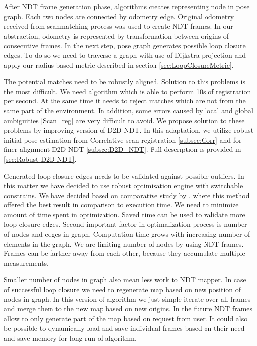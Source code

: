After \gls{NDT} frame generation phase, algorithms creates representing node in pose graph. Each two nodes are connected by odometry edge. Original odometry received from scanmatching process was used to create \gls{NDT} frames. In our abstraction, odometry is represented by transformation between origins of consecutive frames. In the next step, pose graph generates possible loop closure edges. To do so we need to traverse a graph with use of Dijkstra projection and apply our radius based metric described in section \ref{sec:LoopClosureMetric}. 

The potential matches need to be robustly aligned. Solution to this problems is the most difficult. We need algorithm which is able to perform 10s of registration per second. At the same time it needs to reject matches which are not from the same part of the environment. In addition, some errors caused by local and global ambiguities \ref{Scan_reg} are very difficult to avoid. We propose solution to these problems by improving version of \gls{D2D}-\gls{NDT}. In this adaptation, we utilize robust initial pose estimation from Correlative scan registration \ref{subsec:Corr} and for finer alignment \gls{D2D}-\gls{NDT} \ref{subsec:D2D_NDT}. Full description is provided in \ref{sec:Robust D2D-NDT}.

Generated loop closure edges needs to be validated against possible outliers. In this matter we have decided to use robust optimization engine with switchable constrains. We have decided based on comparative study by \cite{RobustOpt}, where this method offered the best result in comparison to execution time. We need to minimize amount of time spent in optimization. Saved time can be used to validate more loop closure edges. Second important factor in optimalization process is number of nodes and edges in graph. Computation time grows with increasing number of elements in the graph. We are limiting number of nodes by using \gls{NDT} frames. Frames can be farther away from each other, because they accumulate multiple measurements.

Smaller number of nodes in graph also mean less work to \gls{NDT} mapper. In case of successful loop closure we need to regenerate map based on new position of nodes in graph. In this version of algorithm we just simple iterate over all frames and merge them to the new map based on new origins. In the future \gls{NDT} frames allow to only generate part of the map based on request from user. It could also be possible to dynamically load and save individual frames based on their need and save memory for long run of algorithm.

